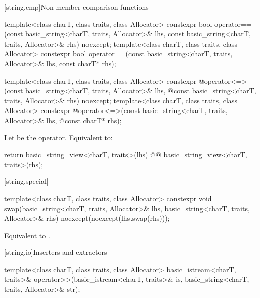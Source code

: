 [string.cmp]{Non-member comparison functions}
\begin{itemdecl}
template<class charT, class traits, class Allocator>
  constexpr bool
    operator==(const basic_string<charT, traits, Allocator>& lhs,
               const basic_string<charT, traits, Allocator>& rhs) noexcept;
template<class charT, class traits, class Allocator>
  constexpr bool operator==(const basic_string<charT, traits, Allocator>& lhs,
                            const charT* rhs);

template<class charT, class traits, class Allocator>
  constexpr @\seebelow@ operator<=>(const basic_string<charT, traits, Allocator>& lhs,
            @\itcorr@                      const basic_string<charT, traits, Allocator>& rhs) noexcept;
template<class charT, class traits, class Allocator>
  constexpr @\seebelow@ operator<=>(const basic_string<charT, traits, Allocator>& lhs,
            @\itcorr@                      const charT* rhs);
\end{itemdecl}
\begin{itemdescr}
\pnum
\effects
Let  be the operator.
Equivalent to:
\begin{codeblock}
return basic_string_view<charT, traits>(lhs) @@ basic_string_view<charT, traits>(rhs);
\end{codeblock}
\end{itemdescr}

[string.special]{}

%
\begin{itemdecl}
template<class charT, class traits, class Allocator>
  constexpr void
    swap(basic_string<charT, traits, Allocator>& lhs,
         basic_string<charT, traits, Allocator>& rhs)
      noexcept(noexcept(lhs.swap(rhs)));
\end{itemdecl}

\begin{itemdescr}
\pnum
\effects
Equivalent to .
\end{itemdescr}

[string.io]{Inserters and extractors}

%
\begin{itemdecl}
template<class charT, class traits, class Allocator>
  basic_istream<charT, traits>&
    operator>>(basic_istream<charT, traits>& is, basic_string<charT, traits, Allocator>& str);
\end{itemdecl}

